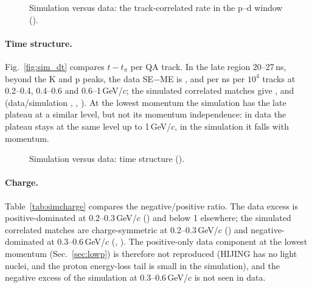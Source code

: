 \begin{figure}[H]
\centering
{}
\caption{Simulation versus data: the track-correlated rate in the p--d window ().}
\end{figure}



\paragraph{Time structure.} Fig.~\ref{fig:sim_dt} compares $t-t_\pi$ per QA track. In the late region 20--27\,ns, beyond the K and p
peaks, the data SE$-$ME is \lateDataA, \lateDataB{} and \lateDataC{} per ns per $10^4$ tracks at 0.2--0.4, 0.4--0.6 and 0.6--1\,GeV/$c$;
the simulated correlated matches give \lateSimA, \lateSimB{} and \lateSimC{} (data/simulation \lateRatA, \lateRatB, \lateRatC). At the
lowest momentum the simulation has the late plateau at a similar level, but not its momentum independence: in data the plateau stays at the
same level up to 1\,GeV/$c$, in the simulation it falls with momentum.

\begin{figure}[H]
\centering
{}
\caption{Simulation versus data: time structure ().}
\end{figure}

\paragraph{Charge.} Table~\ref{tab:simcharge} compares the negative/positive ratio. The data excess is positive-dominated at
0.2--0.3\,GeV/$c$ (\chDataA) and below 1 elsewhere; the simulated correlated matches are charge-symmetric at 0.2--0.3\,GeV/$c$
(\chSimA) and negative-dominated at 0.3--0.6\,GeV/$c$ (\chSimB, \chSimC). The positive-only data component at the lowest momentum
(Sec.~\ref{sec:lowp}) is therefore not reproduced (HIJING has no light nuclei, and the proton energy-loss tail is small in the
simulation), and the negative excess of the simulation at 0.3--0.6\,GeV/$c$ is not seen in data.

